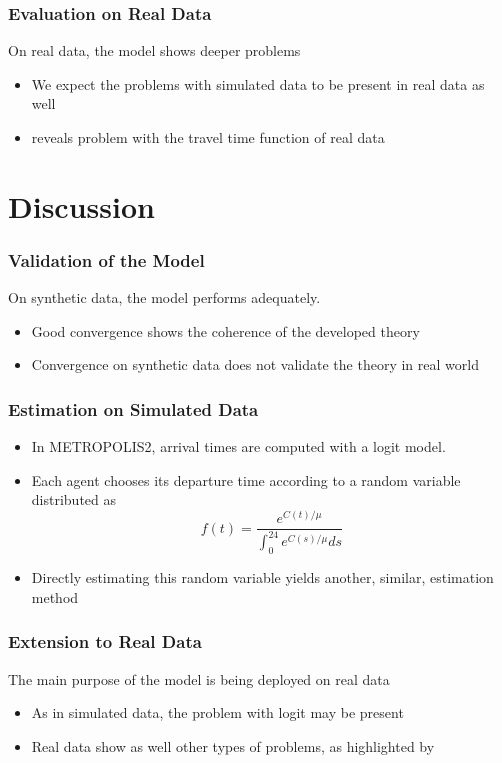\documentclass[hyperref={pdfpagelabels=false}]{beamer}
\begin{document}
\begin{frame}
  \frametitle{Evaluation on Real Data}
  On real data, the model shows deeper problems
  \begin{itemize}
  \item<1-> We expect the problems with simulated data to be present in real data as well
  \item<2-> \textcite{https://doi.org/10.1111/iere.12692} reveals problem with the travel time function of real data
  \end{itemize}
\end{frame}

\section{Discussion}

\begin{frame}
  \tableofcontents[currentsection]
\end{frame}

\begin{frame}
  \frametitle{Validation of the Model}
  On synthetic data, the model performs adequately.
  \begin{itemize}
  \item<2-> Good convergence shows the coherence of the developed theory
  \item<3-> Convergence on synthetic data does not validate the theory in real world
  \end{itemize}
\end{frame}

\begin{frame}
  \frametitle{Estimation on Simulated Data}
  \begin{itemize}
  \item In METROPOLIS2, arrival times are computed with a logit model.
  \item Each agent chooses its departure time according to a random variable distributed as
    \begin{equation*}
      f(t) = \frac{e^{C(t)/\mu}}{\int_0^{24} e^{C(s)/\mu} ds}
    \end{equation*}
  \item Directly estimating this random variable yields another, similar, estimation method 
  \end{itemize}
\end{frame}

\begin{frame}
  \frametitle{Extension to Real Data}
  The main purpose of the model is being deployed on real data
  \begin{itemize}
  \item<2-> As in simulated data, the problem with logit may be present
  \item<3-> Real data show as well other types of problems, as highlighted by \textcite{https://doi.org/10.1111/iere.12692}
  \end{itemize}
\end{frame}
\end{document}
